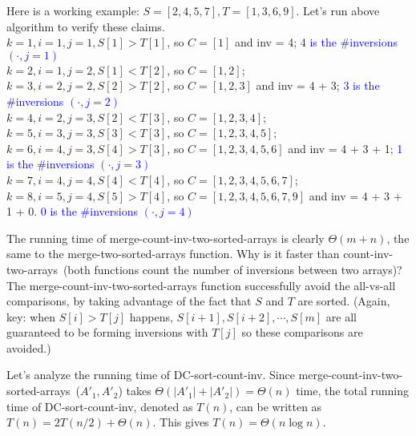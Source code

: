 Here is a working example: $S = [2, 4, 5, 7], T = [1, 3, 6, 9]$. Let's run above algorithm to verify these claims. \\
$k = 1, i = 1, j = 1, S[1] > T[1]$, so $C = [1]$ and inv = 4; \textcolor{blue}{4 is the \#inversions $(\cdot, j = 1)$}\\
$k = 2, i = 1, j = 2, S[1] < T[2]$, so $C = [1, 2]$;\\
$k = 3, i = 2, j = 2, S[2] > T[2]$, so $C = [1, 2, 3]$ and inv = 4 + 3; \textcolor{blue}{3 is the \#inversions $(\cdot, j = 2)$}\\
$k = 4, i = 2, j = 3, S[2] < T[3]$, so $C = [1, 2, 3, 4]$;\\
$k = 5, i = 3, j = 3, S[3] < T[3]$, so $C = [1, 2, 3, 4, 5]$;\\
$k = 6, i = 4, j = 3, S[4] > T[3]$, so $C = [1, 2, 3, 4, 5, 6]$ and inv = 4 + 3 + 1; \textcolor{blue}{1 is the \#inversions $(\cdot, j = 3)$}\\
$k = 7, i = 4, j = 4, S[4] < T[4]$, so $C = [1, 2, 3, 4, 5, 6, 7]$;\\
$k = 8, i = 5, j = 4, S[5] > T[4]$, so $C = [1, 2, 3, 4, 5, 6, 7, 9]$ and inv = 4 + 3 + 1 + 0. \textcolor{blue}{0 is the \#inversions $(\cdot, j = 4)$}

The running time of merge-count-inv-two-sorted-arrays is clearly $\Theta(m + n)$, the same to the merge-two-sorted-arrays function.
Why is it faster than count-inv-two-arrays~(both functions count the number of inversions between two arrays)?
The merge-count-inv-two-sorted-arrays function successfully avoid the all-vs-all comparisons, by taking advantage of the fact
that $S$ and $T$ are sorted. (Again, key: when $S[i] > T[j]$ happens, $S[i + 1], S[i + 2], \cdots, S[m]$ are all guaranteed to be forming
inversions with $T[j]$ so these comparisons are avoided.)

Let's analyze the running time of DC-sort-count-inv. 
Since merge-count-inv-two-sorted-arrays~($A'_1, A'_2$) takes $\Theta(|A'_1| + |A'_2|) = \Theta(n)$ time,
the total running time of DC-sort-count-inv, denoted as $T(n)$, can be written as $T(n) = 2T(n/2) + \Theta(n)$.
This gives $T(n) = \Theta(n\log n)$.



